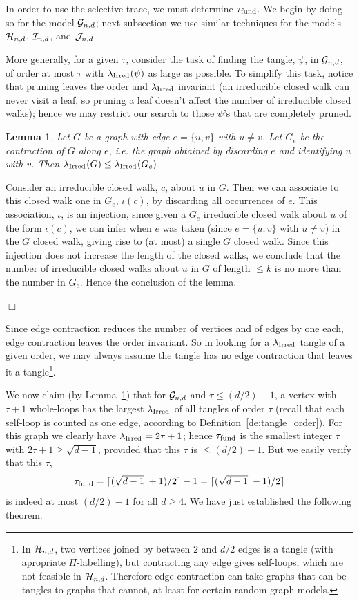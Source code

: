 \documentclass[12pt]{article}
\newtheorem{lemma}[theorem]{Lemma}
\newcommand{\cg}{{\cal G}}
\newcommand{\ch}{{\cal H}}
\newcommand{\ci}{{\cal I}}
\newcommand{\cj}{{\cal J}}
\newcommand{\cjnd}{\cj_{n,d}}
\newcommand{\cind}{\ci_{n,d}}
\newcommand{\cgnd}{\cg_{n,d}}
\newcommand{\chnd}{\ch_{n,d}}
\newcommand{\fund}{{\rm fund}}
\newcommand{\taufund}{{\tau_\fund}}
\newcommand{\tang}{{\psi}}	%
\newcommand{\proof}{{\par\noindent {\bf Proof}\space\space}}
\newcommand{\proofbox}{\begin{flushright}$\Box$\end{flushright}}
\newcommand{\ird}[1]{{\rm Irred}_{#1}}
\begin{document}
In order to use the selective trace, we must determine $\taufund$.
We begin by doing so for the model $\cgnd$; next subsection
we use similar
techniques for the models $\chnd$, $\cind$, and $\cjnd$.

More generally, for a given $\tau$, consider the task of finding the
tangle, $\tang$, in $\cgnd$, of order at most
$\tau$ with $\lambda_{\ird{}}(\tang)$
as large as possible.  To simplify this task, notice that pruning leaves
the order and $\lambda_{\ird{}}$ invariant (an irreducible closed
walk can never visit a leaf, so pruning a leaf doesn't affect the number
of irreducible closed walks); hence we may restrict our
search to those $\tang$'s that are completely pruned.


\begin{lemma}\label{lm:contract}
Let $G$ be a graph with edge $e=\{u,v\}$ with $u\ne v$.
Let $G_e$ be the {\em contraction} of $G$ along $e$, i.e. the graph
obtained by discarding $e$ and identifying $u$ with $v$.  Then
$\lambda_{\ird{}}(G)\le \lambda_{\ird{}}(G_e)$.
\end{lemma}
\proof Consider an irreducible closed walk, $c$, about $u$ in $G$.  Then we can
associate to this closed walk one in $G_e$, $\iota(c)$,
by discarding all occurrences
of $e$.  This association, $\iota$,
is an injection, since given a $G_e$ irreducible
closed walk about $u$ of the form $\iota(c)$,
we can infer when $e$ was taken (since 
$e=\{u,v\}$ with $u\ne v$) in the $G$ closed walk, giving rise to (at most) a
single $G$ closed walk.  Since this injection does not increase the length of
the closed walks, we conclude that the number of irreducible closed walks about $u$
in $G$ of length $\le k$ is no more than the number in $G_e$.  Hence
the conclusion of the lemma.
\proofbox

Since edge contraction reduces the number of vertices and of edges by
one each, edge contraction leaves the order invariant.  So in looking
for a $\lambda_{\ird{}}$ tangle of a given order, we may always assume
the tangle has no edge contraction that leaves it a tangle\footnote{
  In $\chnd$, two vertices joined by between $2$ and $d/2$ edges is
  a tangle (with apropriate $\Pi$-labelling), but contracting any edge
  gives self-loops, which are not feasible in $\chnd$.  Therefore 
  edge contraction can take graphs that can be tangles to graphs that
  cannot, at least for certain random graph models.}.

We now claim (by Lemma~\ref{lm:contract})
that for $\cgnd$ and $\tau\le (d/2)-1$, a vertex with $\tau+1$
whole-loops has the largest $\lambda_{\ird{}}$ of all tangles of order $\tau$
(recall that each self-loop is counted as one edge, according to
Definition~\ref{de:tangle_order}).
For this graph we clearly have $\lambda_{\ird{}}=2\tau+1$; hence
$\taufund$ is the smallest integer $\tau$ with $2\tau+1\ge\sqrt{d-1}$,
provided that this $\tau$ is $\le (d/2)-1$.
But we easily verify that this $\tau$,
$$
\taufund=\lceil (\sqrt{d-1}\;+1)/2 \rceil-1=\lceil (\sqrt{d-1}\;-1)/2 \rceil
$$
is indeed at most $(d/2)-1$ for all $d\ge 4$.
We have just established
the following theorem.
\end{document}
